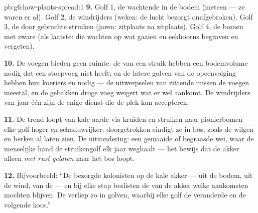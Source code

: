 \begin{solution}{pb:g6:how-plants-spread:1}
\textbf{9.} Golf 1, de wachtende  in de bodem (meteen --- ze waren
er al). Golf 2, de windrijders (weken: de lucht bezorgt onafgebroken).
Golf 3, de door  gebrachte struiken (jaren: zitplaats na
zitplaats). Golf 4, de bomen met zware  (als laatste: die wachten op
wat gaaien en eekhoorns begraven en vergeten).

\textbf{10.} De voegen bieden geen ruimte: de  van een struik
hebben een bodemvolume nodig dat een stoepvoeg niet heeft; en de latere
golven van de opeenvolging hebben hun koeriers en  nodig
--- de uitwerpselen van zittende  missen de voegen meestal, en de
gebakken droge voeg weigert wat er wel aankomt. De windrijders van jaar
één zijn de enige dienst die de plek kan accepteren.

\textbf{11.} De trend loopt van kale aarde via kruiden en struiken naar
pionierbomen --- elke golf hoger en schaduwrijker: doorgetrokken eindigt
ze in bos, zoals de wilgen en berken al laten zien. De uitzondering: een
gemaaide of begraasde wei, waar de menselijke hand de struikengolf elk
jaar weghaalt --- het bewijs dat de akker alleen \emph{met rust gelaten}
naar het bos loopt.

\textbf{12.} Bijvoorbeeld: ``De  bezorgde kolonisten op de
kale akker --- uit de bodem, uit de wind, van de  --- en bij elke
stap beslisten de  van de akker welke aankomsten mochten
blijven. De  verliep zo in golven, waarbij elke golf de
 veranderde en de volgende koos.''
\end{solution}
